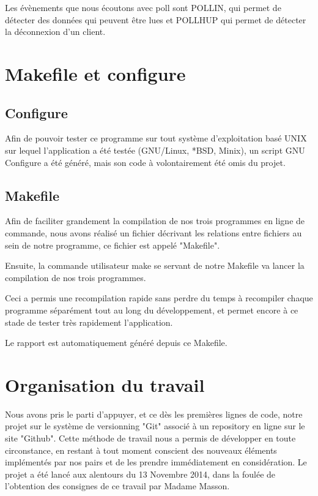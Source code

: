 \documentclass{report}
\begin{document}
{                        Les évènements que nous écoutons avec poll sont POLLIN, qui permet de détecter des données qui peuvent être lues et POLLHUP qui permet de détecter la déconnexion d'un client.

	\section{Makefile et configure}

		\subsection{Configure}

			Afin de pouvoir tester ce programme sur tout système d'exploitation basé UNIX sur lequel l'application a été testée (GNU/Linux, *BSD, Minix), un script GNU Configure\cite{configure} a été généré, mais son code à volontairement été omis du projet.

		\subsection{Makefile}

			Afin de faciliter grandement la compilation de nos trois programmes en ligne de commande, nous avons réalisé un fichier décrivant les
			relations entre fichiers au sein de notre programme, ce fichier est appelé "Makefile".

			Ensuite, la commande utilisateur make\cite{makeMan} se servant de notre Makefile va lancer la compilation de nos trois programmes.

			Ceci a permis une recompilation rapide sans perdre du temps à recompiler chaque programme séparément tout au long du développement,
			et permet encore à ce stade de tester très rapidement l'application.

                        Le rapport est automatiquement généré depuis ce Makefile.


	\section{Organisation du travail}

		Nous avons pris le parti d'appuyer, et ce dès les premières lignes de code, notre projet sur le système de versionning "Git" associé
		à un repository en ligne sur le site "Github".
		Cette méthode de travail nous a permis de développer en toute circonstance, en restant à tout moment conscient des nouveaux éléments 
		implémentés par nos pairs et de les prendre immédiatement en considération.
		Le projet a été lancé aux alentours du 13 Novembre 2014, dans la foulée de l'obtention des consignes de ce travail par Madame Masson.

}
\end{document}
